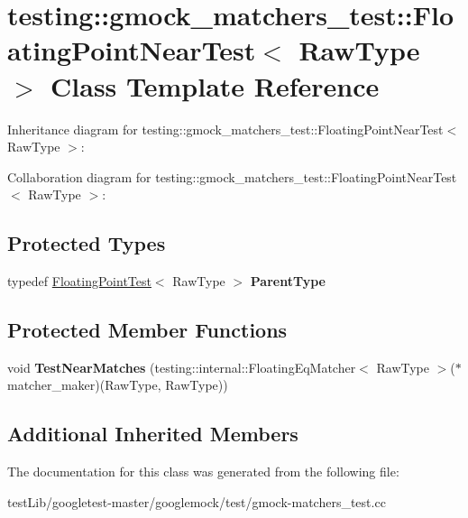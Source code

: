 \hypertarget{classtesting_1_1gmock__matchers__test_1_1FloatingPointNearTest}{}\section{testing\+:\+:gmock\+\_\+matchers\+\_\+test\+:\+:Floating\+Point\+Near\+Test$<$ Raw\+Type $>$ Class Template Reference}
\label{classtesting_1_1gmock__matchers__test_1_1FloatingPointNearTest}


Inheritance diagram for testing\+:\+:gmock\+\_\+matchers\+\_\+test\+:\+:Floating\+Point\+Near\+Test$<$ Raw\+Type $>$\+:


Collaboration diagram for testing\+:\+:gmock\+\_\+matchers\+\_\+test\+:\+:Floating\+Point\+Near\+Test$<$ Raw\+Type $>$\+:
\subsection*{Protected Types}
\begin{DoxyCompactItemize}
\item 
\mbox{\label{classtesting_1_1gmock__matchers__test_1_1FloatingPointNearTest_ac767d2bf3e518d1e7cf9dfafc76cc53a}} 
typedef \hyperlink{classtesting_1_1gmock__matchers__test_1_1FloatingPointTest}{Floating\+Point\+Test}$<$ Raw\+Type $>$ {\bfseries Parent\+Type}
\end{DoxyCompactItemize}
\subsection*{Protected Member Functions}
\begin{DoxyCompactItemize}
\item 
\mbox{\label{classtesting_1_1gmock__matchers__test_1_1FloatingPointNearTest_a712b564197ab76f58d345c5e3e73955d}} 
void {\bfseries Test\+Near\+Matches} (testing\+::internal\+::\+Floating\+Eq\+Matcher$<$ Raw\+Type $>$($\ast$matcher\+\_\+maker)(Raw\+Type, Raw\+Type))
\end{DoxyCompactItemize}
\subsection*{Additional Inherited Members}


The documentation for this class was generated from the following file\+:\begin{DoxyCompactItemize}
\item 
test\+Lib/googletest-\/master/googlemock/test/gmock-\/matchers\+\_\+test.\+cc\end{DoxyCompactItemize}
